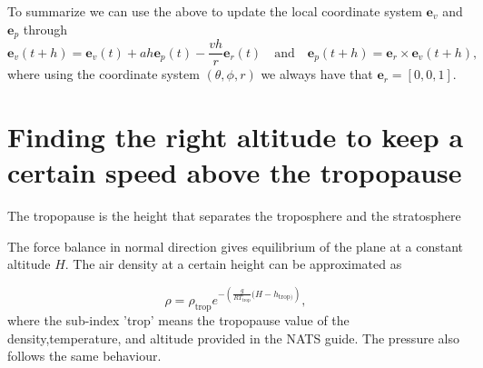 \documentclass{article}
\renewcommand{\vec}[1]{\boldsymbol{#1}}
\begin{document}
 
To summarize we can use the above to update the local coordinate system $\vec e_v$ and $\vec e_p$ through
\begin{equation}
    \vec e_v(t+h) = \vec e_v(t) + a h \vec e_p(t) - \frac{v h}{r} \vec e_r(t)   \quad \text{and} \quad 
    \vec e_p(t+h) = \vec e_r \times \vec e_v(t+h),
\end{equation}
where using the coordinate system $(\theta,\phi,r)$ we always have that $\vec e_r = [0,0,1]$.



\section{Finding the right altitude to keep a certain speed above the tropopause}

The tropopause is the height that separates the troposphere and the stratosphere 

The force balance in normal direction gives equilibrium of the plane at a constant altitude $H$. 
The air density at a certain height can be approximated as

\begin{equation}
    \rho= \rho_{\text{trop}}e^{-\left( \frac{g}{RT_{\text{trop}}}(H-h_{\text{trop})} \right)},
\end{equation}
where the sub-index 'trop' means the tropopause value of the density,temperature, and altitude provided in the NATS guide. The pressure also follows the same behaviour.
\end{document}
